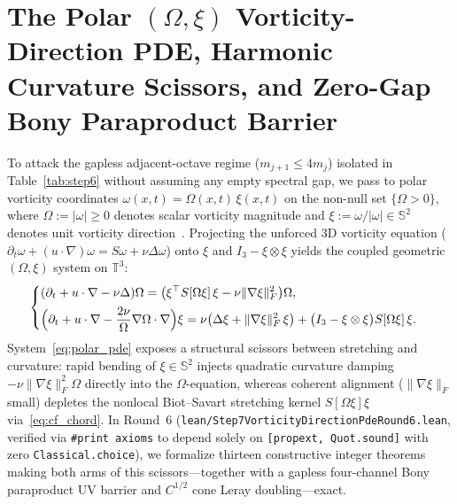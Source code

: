 \documentclass[11pt]{article}
\theoremstyle{plain}
\theoremstyle{definition}
\begin{document}
\section{The Polar $(\Omega,\xi)$ Vorticity-Direction PDE, Harmonic Curvature Scissors, and Zero-Gap Bony Paraproduct Barrier}\label{sec:step7}

To attack the gapless adjacent-octave regime ($m_{j+1} \le 4 m_j$) isolated in Table~\ref{tab:step6} without assuming any empty spectral gap, we pass to polar vorticity coordinates $\omega(x,t) = \Omega(x,t)\,\xi(x,t)$ on the non-null set $\{\Omega > 0\}$, where $\Omega := |\omega| \ge 0$ denotes scalar vorticity magnitude and $\xi := \omega/|\omega| \in \mathbb{S}^2$ denotes unit vorticity direction~\cite{cf1993}. Projecting the unforced 3D vorticity equation ($\partial_t \omega + (u\cdot\nabla)\omega = S\omega + \nu\Delta\omega$) onto $\xi$ and $I_3 - \xi\otimes\xi$ yields the coupled geometric $(\Omega,\xi)$ system on $\mathbb{T}^3$:
\begin{equation}\label{eq:polar_pde}
  \begin{cases}
    \displaystyle (\partial_t + u\cdot\nabla - \nu\Delta)\Omega = \bigl(\xi^\top S[\Omega\xi]\,\xi - \nu\|\nabla\xi\|_F^2\bigr)\Omega, \\[0.45em]
    \displaystyle \Bigl(\partial_t + u\cdot\nabla - \frac{2\nu}{\Omega}\nabla\Omega\cdot\nabla\Bigr)\xi = \nu\bigl(\Delta\xi + \|\nabla\xi\|_F^2\,\xi\bigr) + \bigl(I_3 - \xi\otimes\xi\bigr)S[\Omega\xi]\,\xi.
  \end{cases}
\end{equation}
System~\eqref{eq:polar_pde} exposes a structural scissors between stretching and curvature: rapid bending of $\xi \in \mathbb{S}^2$ injects quadratic curvature damping $-\nu\|\nabla\xi\|_F^2\Omega$ directly into the $\Omega$-equation, whereas coherent alignment ($\|\nabla\xi\|_F$ small) depletes the nonlocal Biot--Savart stretching kernel $S[\Omega\xi]\xi$ via~\eqref{eq:cf_chord}. In Round~6 (\texttt{lean/\allowbreak Step7Vorticity\allowbreak DirectionPdeRound6.lean}, verified via \texttt{\#print axioms} to depend solely on \texttt{[propext, Quot.sound]} with zero \texttt{Classical.choice}), we formalize thirteen constructive integer theorems making both arms of this scissors---together with a gapless four-channel Bony paraproduct UV barrier and $C^{1/2}$ cone Leray doubling---exact.
\end{document}

